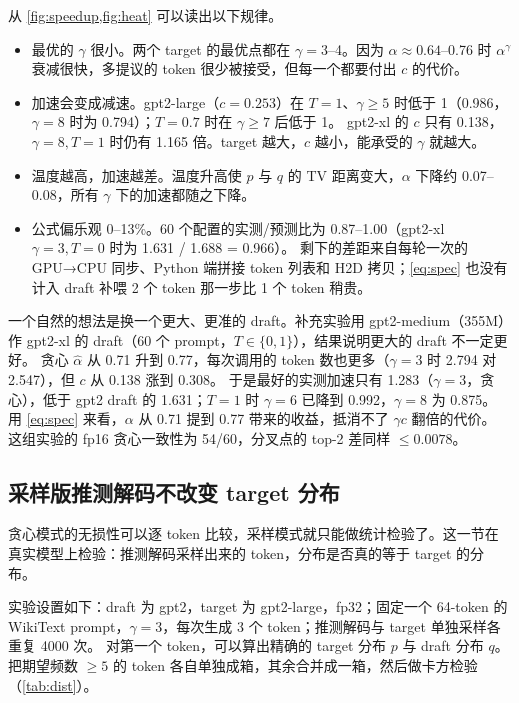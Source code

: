 \documentclass[11pt,a4paper]{ctexart}
\begin{document}
从 \cref{fig:speedup,fig:heat} 可以读出以下规律。
\begin{itemize}
  \item 最优的 $\gamma$ 很小。两个 target 的最优点都在 $\gamma{=}3$--4。因为 $\alpha\approx0.64$--0.76 时 $\alpha^{\gamma}$ 衰减很快，多提议的 token 很少被接受，但每一个都要付出 $c$ 的代价。
  \item 加速会变成减速。gpt2-large（$c{=}0.253$）在 $T{=}1$、$\gamma\ge5$ 时低于 1（0.986，$\gamma{=}8$ 时为 0.794）；$T{=}0.7$ 时在 $\gamma\ge7$ 后低于 1。
        gpt2-xl 的 $c$ 只有 0.138，$\gamma{=}8,T{=}1$ 时仍有 1.165 倍。target 越大，$c$ 越小，能承受的 $\gamma$ 就越大。
  \item 温度越高，加速越差。温度升高使 $p$ 与 $q$ 的 TV 距离变大，$\alpha$ 下降约 0.07--0.08，所有 $\gamma$ 下的加速都随之下降。
  \item 公式偏乐观 0--13\%。60 个配置的实测/预测比为 0.87--1.00（gpt2-xl $\gamma{=}3,T{=}0$ 时为 1.631 / 1.688 = 0.966）。
        剩下的差距来自每轮一次的 GPU→CPU 同步、Python 端拼接 token 列表和 H2D 拷贝；\cref{eq:spec} 也没有计入 draft 补喂 2 个 token 那一步比 1 个 token 稍贵。
\end{itemize}

一个自然的想法是换一个更大、更准的 draft。补充实验用 gpt2-medium（355M）作 gpt2-xl 的 draft（60 个 prompt，$T\in\{0,1\}$），结果说明更大的 draft 不一定更好。
贪心 $\hat\alpha$ 从 0.71 升到 0.77，每次调用的 token 数也更多（$\gamma{=}3$ 时 2.794 对 2.547），但 $c$ 从 0.138 涨到 0.308。
于是最好的实测加速只有 1.283（$\gamma{=}3$，贪心），低于 gpt2 draft 的 1.631；$T{=}1$ 时 $\gamma{=}6$ 已降到 0.992，$\gamma{=}8$ 为 0.875。
用 \cref{eq:spec} 来看，$\alpha$ 从 0.71 提到 0.77 带来的收益，抵消不了 $\gamma c$ 翻倍的代价。
这组实验的 fp16 贪心一致性为 54/60，分叉点的 top-2 差同样 $\le 0.0078$。

\subsection{采样版推测解码不改变 target 分布}

贪心模式的无损性可以逐 token 比较，采样模式就只能做统计检验了。这一节在真实模型上检验：推测解码采样出来的 token，分布是否真的等于 target 的分布。

实验设置如下：draft 为 gpt2，target 为 gpt2-large，fp32；固定一个 64-token 的 WikiText prompt，$\gamma{=}3$，每次生成 3 个 token；推测解码与 target 单独采样各重复 4000 次。
对第一个 token，可以算出精确的 target 分布 $p$ 与 draft 分布 $q$。把期望频数 $\ge5$ 的 token 各自单独成箱，其余合并成一箱，然后做卡方检验（\cref{tab:dist}）。
\end{document}
